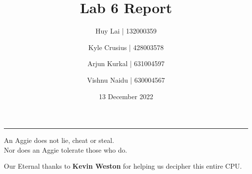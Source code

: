 \documentclass[fleqn,12pt]{article}
\title{\vspace{-2.5cm}Lab 6 Report}
\author{
    Huy Lai \hspace{20pt}   | 132000359     \and \vspace{-3em}
    Kyle Crusius            | 428003578     \and \vspace{-3em}
    Arjun Kurkal            | 631004597     \and \vspace{-3em}
    Vishnu Naidu            | 630004567
}
\affil{Texas A\&M University}
\date{\vspace{-28pt}13 December 2022}
\begin{document}
\maketitle
\begin{center}
\vspace{-42pt}
\rule{\textwidth}{.1pt}
{\large
An Aggie does not lie, cheat or steal.\\
Nor does an Aggie tolerate those who do.
}
\end{center}

\noindent
Our Eternal thanks to \textbf{Kevin Weston} for helping us decipher this entire CPU.







\end{document}
